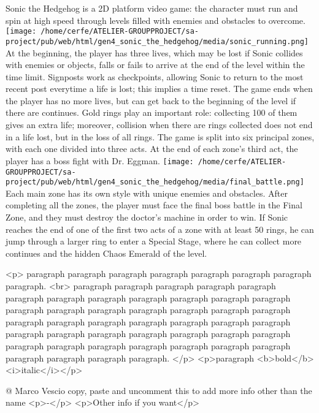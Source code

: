 \documentclass[a4paper,10pt]{book}
\begin{document}
          Sonic the Hedgehog is a 2D platform video game: the character must run and spin at high speed through levels filled with enemies and obstacles to overcome. 
 \texttt{[image: /home/cerfe/ATELIER-GROUPPROJECT/sa-project/pub/web/html/gen4\_sonic\_the\_hedgehog/media/sonic\_running.png]}
          At the beginning, the player has three lives, which may be lost if Sonic collides with enemies or objects, falls or fails to arrive at the end of the level within the time limit. 
          Signposts work as checkpoints, allowing Sonic to return to the most recent post everytime a life is lost; this implies a time reset. The game ends when the player has no more lives, but can get back to the beginning of the level if there are continues. Gold rings play an important role: collecting 100 of them gives an extra life; moreover, collision when there are rings collected does not end in a life lost, but in the loss of all rings. 
          The game is split into six principal zones, with each one divided into three acts. At the end of each zone's third act, the player has a boss fight with Dr. Eggman. 
 \texttt{[image: /home/cerfe/ATELIER-GROUPPROJECT/sa-project/pub/web/html/gen4\_sonic\_the\_hedgehog/media/final\_battle.png]}
          Each main zone has its own style with unique enemies and obstacles. After completing all the zones, the player must face the final boss battle in the Final Zone, and they must destroy the doctor's machine in order to win.
           If Sonic reaches the end of one of the first two acts of a zone with at least 50 rings, he can jump through a larger ring to enter a Special Stage, where he can collect more continues and the hidden Chaos Emerald of the level. 
 
 <p>
          paragraph paragraph paragraph paragraph paragraph paragraph paragraph paragraph. <br>
          paragraph paragraph paragraph paragraph paragraph paragraph paragraph paragraph paragraph paragraph paragraph paragraph paragraph paragraph paragraph paragraph paragraph paragraph paragraph paragraph paragraph paragraph paragraph paragraph paragraph paragraph paragraph paragraph paragraph paragraph paragraph paragraph paragraph paragraph paragraph paragraph paragraph paragraph paragraph paragraph paragraph paragraph paragraph paragraph.
        </p>
        <p>paragraph <b>bold</b> <i>italic</i></p> 
 
 @ Marco Vescio 
  copy, paste and uncomment this to add more info other than the name
            <p>-</p>
            <p>Other info if you want</p>
           
\end{document}
